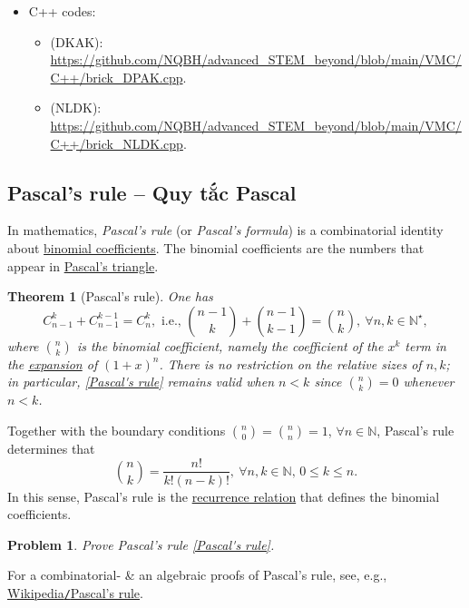 \documentclass{article}
\newtheorem{problem}{Problem}
\newtheorem{theorem}{Theorem}
\begin{document}
\begin{itemize}
	\item C++ codes:
	\begin{itemize}
		\item (DKAK): \url{https://github.com/NQBH/advanced_STEM_beyond/blob/main/VMC/C++/brick_DPAK.cpp}.
		\item (NLDK): \url{https://github.com/NQBH/advanced_STEM_beyond/blob/main/VMC/C++/brick_NLDK.cpp}.
	\end{itemize}
\end{itemize}

\subsection{Pascal's rule -- Quy tắc Pascal}
In mathematics, {\it Pascal's rule} (or {\it Pascal's formula}) is a combinatorial identity about \href{https://en.wikipedia.org/wiki/Binomial_coefficient}{binomial coefficients}. The binomial coefficients are the numbers that appear in \href{https://en.wikipedia.org/wiki/Pascal%27s_triangle}{Pascal's triangle}.

\begin{theorem}[Pascal's rule]
	One has
	\begin{equation}
		\label{Pascal's rule}
		\tag{Pasr}
		C_{n-1}^k + C_{n-1}^{k-1} = C_n^k,\mbox{ i.e., }\binom{n - 1}{k} + \binom{n - 1}{k - 1} = \binom{n}{k},\ \forall n,k\in\mathbb{N}^\star,
	\end{equation}
	where $\binom{n}{k}$ is the binomial coefficient, namely the coefficient of the $x^k$ term in the \href{https://en.wikipedia.org/wiki/Polynomial_expansion}{expansion} of $(1 + x)^n$. There is no restriction on the relative sizes of $n,k$; in particular, \eqref{Pascal's rule} remains valid when $n < k$ since $\binom{n}{k} = 0$ whenever $n < k$.
\end{theorem}
Together with the boundary conditions $\binom{n}{0} = \binom{n}{n} = 1$, $\forall n\in\mathbb{N}$, Pascal's rule determines that
\begin{equation*}
	\binom{n}{k} = \frac{n!}{k!(n - k)!},\ \forall n,k\in\mathbb{N},\,0\le k\le n.
\end{equation*}
In this sense, Pascal's rule is the \href{https://en.wikipedia.org/wiki/Recurrence_relation}{recurrence relation} that defines the binomial coefficients.

\begin{problem}
	Prove Pascal's rule \eqref{Pascal's rule}.
\end{problem}
For a combinatorial- \& an algebraic proofs of Pascal's rule, see, e.g., \href{https://en.wikipedia.org/wiki/Pascal%27s_rule}{Wikipedia{\tt/}Pascal's rule}.
\end{document}

